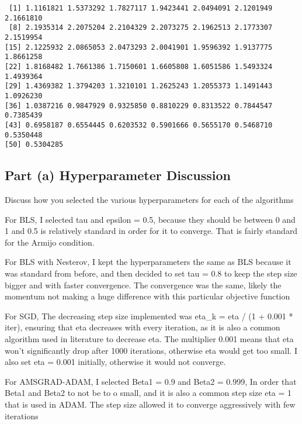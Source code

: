 \documentclass[
  letterpaper,
  DIV=11,
  numbers=noendperiod]{scrartcl}
\newenvironment{Shaded}{\begin{snugshade}}{\end{snugshade}}
\newcommand{\DecValTok}[1]{\textcolor[rgb]{0.68,0.00,0.00}{#1}}
\newcommand{\FunctionTok}[1]{\textcolor[rgb]{0.28,0.35,0.67}{#1}}
\newcommand{\NormalTok}[1]{\textcolor[rgb]{0.00,0.23,0.31}{#1}}
\newcommand{\SpecialCharTok}[1]{\textcolor[rgb]{0.37,0.37,0.37}{#1}}
\begin{document}
\begin{Shaded}
\end{Shaded}

\begin{verbatim}
 [1] 1.1161821 1.5373292 1.7827117 1.9423441 2.0494091 2.1201949 2.1661810
 [8] 2.1935314 2.2075204 2.2104329 2.2073275 2.1962513 2.1773307 2.1519954
[15] 2.1225932 2.0865053 2.0473293 2.0041901 1.9596392 1.9137775 1.8661258
[22] 1.8168482 1.7661386 1.7150601 1.6605808 1.6051586 1.5493324 1.4939364
[29] 1.4369382 1.3794203 1.3210101 1.2625243 1.2055373 1.1491443 1.0926230
[36] 1.0387216 0.9847929 0.9325850 0.8810229 0.8313522 0.7844547 0.7385439
[43] 0.6958187 0.6554445 0.6203532 0.5901666 0.5655170 0.5468710 0.5350448
[50] 0.5304285
\end{verbatim}

\subsection{Part (a) Hyperparameter
Discussion}\label{part-a-hyperparameter-discussion}

Discuss how you selected the various hyperparameters for each of the
algorithms

For BLS, I selected tau and epsilon = 0.5, because they should be
between 0 and 1 and 0.5 is relatively standard in order for it to
converge. That is fairly standard for the Armijo condition.

For BLS with Nesterov, I kept the hyperparameters the same as BLS
because it was standard from before, and then decided to set tau = 0.8
to keep the step size bigger and with faster convergence. The
convergence was the same, likely the momentum not making a huge
difference with this particular objective function

For SGD, The decreasing step size implemented was eta\_k = eta / (1 +
0.001 * iter), ensuring that eta decreases with every iteration, as it
is also a common algorithm used in literature to decrease eta. The
multiplier 0.001 means that eta won't significantly drop after 1000
iterations, otherwise eta would get too small. I also set eta = 0.001
initially, otherwise it would not converge.

For AMSGRAD-ADAM, I selected Beta1 = 0.9 and Beta2 = 0.999, In order
that Beta1 and Beta2 to not be to o small, and it is also a common step
size eta = 1 that is used in ADAM. The step size allowed it to converge
aggressively with few iterations
\end{document}
